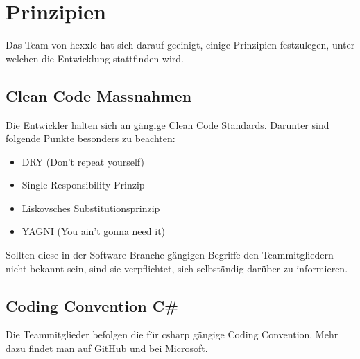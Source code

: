 \documentclass[../main.tex]{subfiles}
\begin{document}
    \section{Prinzipien}
    \label{section:Prinzipien}
    \par Das Team von \gls{hexxle} hat sich darauf geeinigt, einige Prinzipien festzulegen, unter welchen die Entwicklung stattfinden wird.
    
    \subsection{Clean Code Massnahmen}
    \label{section:CleanCodeMassnahmen}
    \par Die Entwickler halten sich an gängige Clean Code Standards. Darunter sind folgende Punkte besonders zu beachten:
    \begin{itemize}
    	\item DRY (Don't repeat yourself)
    	\item Single-Responsibility-Prinzip
    	\item Liskovsches Substitutionsprinzip
    	\item YAGNI (You ain't gonna need it)
    \end{itemize}
    \par Sollten diese in der Software-Branche gängigen Begriffe den Teammitgliedern nicht bekannt sein, sind sie verpflichtet, sich selbständig darüber zu informieren.
    
    \subsection{Coding Convention C\#}
    \label{section:CodingConvention}
    \par Die Teammitglieder befolgen die für \gls{csharp} gängige Coding Convention. Mehr dazu findet man auf \href{https://github.com/ktaranov/naming-convention/blob/master/C\%23\%20Coding\%20Standards\%20and\%20Naming\%20Conventions.md}{GitHub} und bei \href{https://docs.microsoft.com/en-us/dotnet/csharp/programming-guide/inside-a-program/coding-conventions}{Microsoft}.
    
\end{document}
